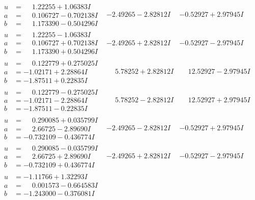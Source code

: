 \documentclass[1p]{elsarticle_modified}
\theoremstyle{definition}
\begin{document}
$$\begin{array}{c|c|c}
\begin{aligned}
u &= \phantom{-}1.22255 + 1.06383 I \\
a &= \phantom{-}0.106727 - 0.702138 I \\
b &= \phantom{-}1.173390 - 0.504296 I\end{aligned}
 & -2.49265 - 2.82812 I & -0.52927 + 2.97945 I \\ \hline\begin{aligned}
u &= \phantom{-}1.22255 - 1.06383 I \\
a &= \phantom{-}0.106727 + 0.702138 I \\
b &= \phantom{-}1.173390 + 0.504296 I\end{aligned}
 & -2.49265 + 2.82812 I & -0.52927 - 2.97945 I \\ \hline\begin{aligned}
u &= \phantom{-}0.122779 + 0.275025 I \\
a &= -1.02171 + 2.28864 I \\
b &= -1.87511 + 0.22835 I\end{aligned}
 & \phantom{-}5.78252 + 2.82812 I & \phantom{-}12.52927 - 2.97945 I \\ \hline\begin{aligned}
u &= \phantom{-}0.122779 - 0.275025 I \\
a &= -1.02171 - 2.28864 I \\
b &= -1.87511 - 0.22835 I\end{aligned}
 & \phantom{-}5.78252 - 2.82812 I & \phantom{-}12.52927 + 2.97945 I \\ \hline\begin{aligned}
u &= \phantom{-}0.290085 + 0.035799 I \\
a &= \phantom{-}2.66725 - 2.89690 I \\
b &= -0.732109 - 0.436774 I\end{aligned}
 & -2.49265 - 2.82812 I & -0.52927 + 2.97945 I \\ \hline\begin{aligned}
u &= \phantom{-}0.290085 - 0.035799 I \\
a &= \phantom{-}2.66725 + 2.89690 I \\
b &= -0.732109 + 0.436774 I\end{aligned}
 & -2.49265 + 2.82812 I & -0.52927 - 2.97945 I \\ \hline\begin{aligned}
u &= -1.11766 + 1.32293 I \\
a &= \phantom{-}0.001573 - 0.664583 I \\
b &= -1.243000 - 0.376081 I\end{aligned}

\end{array}$$
\end{document}
